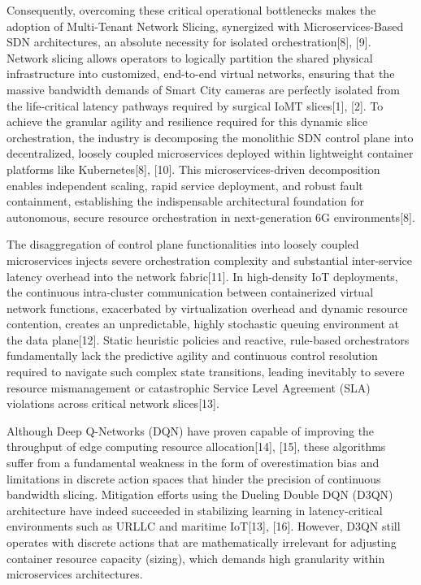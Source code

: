 Consequently, overcoming these critical operational bottlenecks makes the adoption of Multi-Tenant Network Slicing, synergized with Microservices-Based SDN architectures, an absolute necessity for isolated orchestration{[}8{]}, {[}9{]}. Network slicing allows operators to logically partition the shared physical infrastructure into customized, end-to-end virtual networks, ensuring that the massive bandwidth demands of Smart City cameras are perfectly isolated from the life-critical latency pathways required by surgical IoMT slices{[}1{]}, {[}2{]}. To achieve the granular agility and resilience required for this dynamic slice orchestration, the industry is decomposing the monolithic SDN control plane into decentralized, loosely coupled microservices deployed within lightweight container platforms like Kubernetes{[}8{]}, {[}10{]}. This microservices-driven decomposition enables independent scaling, rapid service deployment, and robust fault containment, establishing the indispensable architectural foundation for autonomous, secure resource orchestration in next-generation 6G environments{[}8{]}.

The disaggregation of control plane functionalities into loosely coupled microservices injects severe orchestration complexity and substantial inter-service latency overhead into the network fabric{[}11{]}. In high-density IoT deployments, the continuous intra-cluster communication between containerized virtual network functions, exacerbated by virtualization overhead and dynamic resource contention, creates an unpredictable, highly stochastic queuing environment at the data plane{[}12{]}. Static heuristic policies and reactive, rule-based orchestrators fundamentally lack the predictive agility and continuous control resolution required to navigate such complex state transitions, leading inevitably to severe resource mismanagement or catastrophic Service Level Agreement (SLA) violations across critical network slices{[}13{]}.

Although Deep Q-Networks (DQN) have proven capable of improving the throughput of edge computing resource allocation{[}14{]}, {[}15{]}, these algorithms suffer from a fundamental weakness in the form of overestimation bias and limitations in discrete action spaces that hinder the precision of continuous bandwidth slicing. Mitigation efforts using the Dueling Double DQN (D3QN) architecture have indeed succeeded in stabilizing learning in latency-critical environments such as URLLC and maritime IoT{[}13{]}, {[}16{]}. However, D3QN still operates with discrete actions that are mathematically irrelevant for adjusting container resource capacity (sizing), which demands high granularity within microservices architectures.

